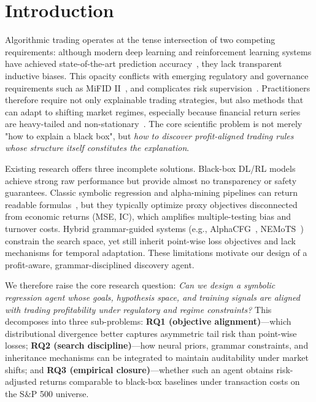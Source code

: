 \section{Introduction}
\label{sec:intro}

Algorithmic trading operates at the tense intersection of two competing requirements: although modern deep learning and reinforcement learning systems have achieved state-of-the-art prediction accuracy~\cite{fischer2018deep}, they lack transparent inductive biases. This opacity conflicts with emerging regulatory and governance requirements such as MiFID II~\cite{eu2014mifid}, and complicates risk supervision~\cite{rudin2019stop}. Practitioners therefore require not only explainable trading strategies, but also methods that can adapt to shifting market regimes, especially because financial return series are heavy-tailed and non-stationary~\cite{cont2001empirical}. The core scientific problem is not merely "how to explain a black box", but \textit{how to discover profit-aligned trading rules whose structure itself constitutes the explanation}.

Existing research offers three incomplete solutions. Black-box DL/RL models achieve strong raw performance but provide almost no transparency or safety guarantees. Classic symbolic regression and alpha-mining pipelines can return readable formulas~\cite{koza1994genetic}, but they typically optimize proxy objectives disconnected from economic returns (MSE, IC), which amplifies multiple-testing bias and turnover costs. Hybrid grammar-guided systems (e.g., AlphaCFG~\cite{yang2026alpha}, NEMoTS~\cite{xie2024nemots}) constrain the search space, yet still inherit point-wise loss objectives and lack mechanisms for temporal adaptation. These limitations motivate our design of a profit-aware, grammar-disciplined discovery agent.

We therefore raise the core research question: \textit{Can we design a symbolic regression agent whose goals, hypothesis space, and training signals are aligned with trading profitability under regulatory and regime constraints?} This decomposes into three sub-problems: \textbf{RQ1 (objective alignment)}---which distributional divergence better captures asymmetric tail risk than point-wise losses; \textbf{RQ2 (search discipline)}---how neural priors, grammar constraints, and inheritance mechanisms can be integrated to maintain auditability under market shifts; and \textbf{RQ3 (empirical closure)}---whether such an agent obtains risk-adjusted returns comparable to black-box baselines under transaction costs on the S\&P 500 universe.


